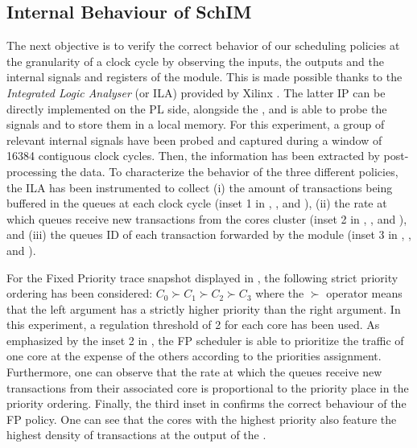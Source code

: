 \subsection{Internal Behaviour of SchIM}
\label{subsec:internal-behaviour-of-schim}
The next objective is to verify the correct behavior of our scheduling
policies at the granularity of a clock cycle by observing the inputs,
the outputs and the internal signals and registers of the \schim
module.  This is made possible thanks to the \emph{Integrated Logic
  Analyser} (or ILA) provided by Xilinx \cite{Xilinx-ILA}. The latter
IP can be directly implemented on the PL side, alongside the \schim,
and is able to probe the signals and to store them in a local
memory. For this experiment, a group of relevant internal signals have
been probed and captured during a window of 16384 contiguous clock
cycles. Then, the information has been extracted by post-processing
the data.  To characterize the behavior of the three different
policies, the ILA has been instrumented to collect (i) the amount of
transactions being buffered in the queues at each clock cycle (inset 1
in , , and
), (ii) the rate at which queues receive
new transactions from the cores cluster (inset 2 in
, , and
), and (iii) the queues ID of each
transaction forwarded by the \schim module (inset 3 in
, , and
).

For the Fixed Priority trace snapshot displayed in
, the following strict priority ordering
has been considered: $C_{0} \succ C_{1} \succ C_{2} \succ C_{3}$ where
the $\succ$ operator means that the left argument has a strictly
higher priority than the right argument. In this experiment, a
regulation threshold of 2 for each core has been used.  As emphasized
by the inset 2 in , the FP scheduler is
able to prioritize the traffic of one core at the expense of the
others according to the priorities assignment. Furthermore, one can
observe that the rate at which the queues receive new transactions
from their associated core is proportional to the priority place in
the priority ordering.  Finally, the third inset in
 confirms the correct behaviour of the FP
policy.%
One can see that the cores
with the highest priority also feature the highest density of
transactions at the output of the \schim.

